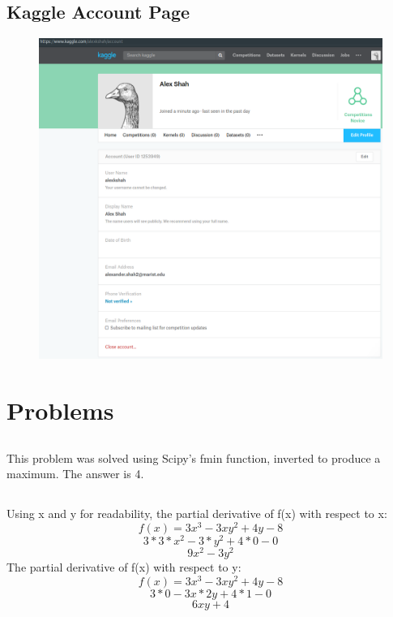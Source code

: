 \documentclass[a4paper]{article}
\begin{document}
\subsection{Kaggle Account Page}
 \begin{figure}[H]
  \includegraphics[width=\textwidth]{2-3-kaggleProof.png}  
\end{figure}

\clearpage

\section{Problems}
\subsection{}
This problem was solved using Scipy's fmin function, inverted to produce a maximum. The answer is 4.



\subsection{}
Using x and y for readability, the partial derivative of f(x) with respect to x:
\begin{equation}
f(x)=3x^3-3xy^2+4y-8
\end{equation}
\begin{equation}
3*3*x^2-3*y^2+4*0-0
\end{equation}
\begin{equation}
9x^2-3y^2
\end{equation}
The partial derivative of f(x) with respect to y:
\begin{equation}
f(x)=3x^3-3xy^2+4y-8
\end{equation}
\begin{equation}
3*0-3x*2y+4*1-0
\end{equation}
\begin{equation}
6xy+4
\end{equation}
\end{document}
